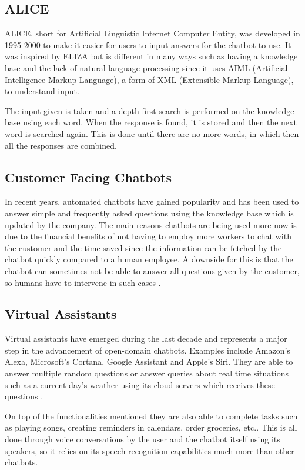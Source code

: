 \documentclass[11pt]{article}
\begin{document}
    \subsection{ALICE}
    ALICE, short for Artificial Linguistic Internet Computer Entity, was developed in 1995-2000 to make it easier for users to input answers for the chatbot to use. It was inspired by ELIZA but is different in many ways such as having a knowledge base and the lack of natural language processing since it uses AIML  (Artificial Intelligence Markup Language), a form of XML (Extensible Markup Language), to understand input. 

    The input given is taken and a depth first search is performed on the knowledge base using each word. When the response is found, it is stored and then the next word is searched again. This is done until there are no more words, in which then all the responses are combined. \citep{abushawar2015alice}

    \subsection{Customer Facing Chatbots}
    In recent years, automated chatbots have gained popularity and has been used to answer simple and frequently asked questions using the knowledge base which is updated by the company. The main reasons chatbots are being used more now is due to the financial benefits of not having to employ more workers to chat with the customer and the time saved since the information can be fetched by the chatbot quickly compared to a human employee. A downside for this is that the chatbot can sometimes not be able to answer all questions given by the customer, so humans have to intervene in such cases \citep{galert2018chatbot}.

    \subsection{Virtual Assistants}
    Virtual assistants have emerged during the last decade and represents a major step in the advancement of open-domain chatbots. Examples include Amazon's Alexa, Microsoft's Cortana, Google Assistant and Apple's Siri. They are able to answer multiple random questions or answer queries about real time situations such as a current day's weather using its cloud servers which receives these questions \citep{burbach2019hey}.

    On top of the functionalities mentioned they are also able to complete tasks such as playing songs, creating reminders in calendars, order groceries, etc.. This is all done through voice conversations by the user and the chatbot itself using its speakers, so it relies on its speech recognition capabilities much more than other chatbots. 
\end{document}
